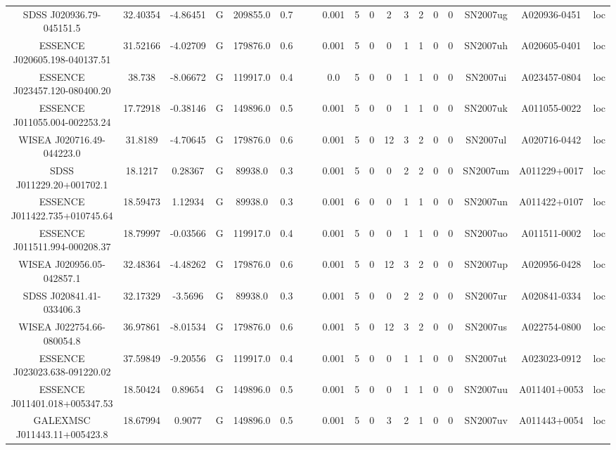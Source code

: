 \begin{table}
\begin{tabular}{ccccccccccccccccccc}
SDSS J020936.79-045151.5 & 32.40354 & -4.86451 & G & 209855.0 & 0.7 &  &  & 0.001 & 5 & 0 & 2 & 3 & 2 & 0 & 0 & SN2007ug & A020936-0451 & loc \\
ESSENCE J020605.198-040137.51 & 31.52166 & -4.02709 & G & 179876.0 & 0.6 &  &  & 0.001 & 5 & 0 & 0 & 1 & 1 & 0 & 0 & SN2007uh & A020605-0401 & loc \\
ESSENCE J023457.120-080400.20 & 38.738 & -8.06672 & G & 119917.0 & 0.4 &  &  & 0.0 & 5 & 0 & 0 & 1 & 1 & 0 & 0 & SN2007ui & A023457-0804 & loc \\
ESSENCE J011055.004-002253.24 & 17.72918 & -0.38146 & G & 149896.0 & 0.5 &  &  & 0.001 & 5 & 0 & 0 & 1 & 1 & 0 & 0 & SN2007uk & A011055-0022 & loc \\
WISEA J020716.49-044223.0 & 31.8189 & -4.70645 & G & 179876.0 & 0.6 &  &  & 0.001 & 5 & 0 & 12 & 3 & 2 & 0 & 0 & SN2007ul & A020716-0442 & loc \\
SDSS J011229.20+001702.1 & 18.1217 & 0.28367 & G & 89938.0 & 0.3 &  &  & 0.001 & 5 & 0 & 0 & 2 & 2 & 0 & 0 & SN2007um & A011229+0017 & loc \\
ESSENCE J011422.735+010745.64 & 18.59473 & 1.12934 & G & 89938.0 & 0.3 &  &  & 0.001 & 6 & 0 & 0 & 1 & 1 & 0 & 0 & SN2007un & A011422+0107 & loc \\
ESSENCE J011511.994-000208.37 & 18.79997 & -0.03566 & G & 119917.0 & 0.4 &  &  & 0.001 & 5 & 0 & 0 & 1 & 1 & 0 & 0 & SN2007uo & A011511-0002 & loc \\
WISEA J020956.05-042857.1 & 32.48364 & -4.48262 & G & 179876.0 & 0.6 &  &  & 0.001 & 5 & 0 & 12 & 3 & 2 & 0 & 0 & SN2007up & A020956-0428 & loc \\
SDSS J020841.41-033406.3 & 32.17329 & -3.5696 & G & 89938.0 & 0.3 &  &  & 0.001 & 5 & 0 & 0 & 2 & 2 & 0 & 0 & SN2007ur & A020841-0334 & loc \\
WISEA J022754.66-080054.8 & 36.97861 & -8.01534 & G & 179876.0 & 0.6 &  &  & 0.001 & 5 & 0 & 12 & 3 & 2 & 0 & 0 & SN2007us & A022754-0800 & loc \\
ESSENCE J023023.638-091220.02 & 37.59849 & -9.20556 & G & 119917.0 & 0.4 &  &  & 0.001 & 5 & 0 & 0 & 1 & 1 & 0 & 0 & SN2007ut & A023023-0912 & loc \\
ESSENCE J011401.018+005347.53 & 18.50424 & 0.89654 & G & 149896.0 & 0.5 &  &  & 0.001 & 5 & 0 & 0 & 1 & 1 & 0 & 0 & SN2007uu & A011401+0053 & loc \\
GALEXMSC J011443.11+005423.8 & 18.67994 & 0.9077 & G & 149896.0 & 0.5 &  &  & 0.001 & 5 & 0 & 3 & 2 & 1 & 0 & 0 & SN2007uv & A011443+0054 & loc \\

\end{tabular}
\end{table}

